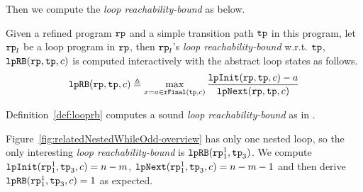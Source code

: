 %
Then we compute the
\emph{loop reachability-bound} as below.
\begin{defn}
 \label{def:looprb}
 Given a refined program $\mathtt{rp}$ and a simple transition path $\mathtt{tp}$ in this program, 
 let $\mathtt{rp}_l$ be a loop program in $\mathtt{rp}$,
 then $\mathtt{rp}_l$'s \emph{loop reachability-bound} w.r.t. $\mathtt{tp}$, $\mathtt{lpRB}(\mathtt{rp}, \mathtt{tp}, c)$
 is computed interactively with the abstract loop states as follows. 
 \[
 \mathtt{lpRB}(\mathtt{rp}, \mathtt{tp}, c) \triangleq
 \max\limits_{x = a \in \mathtt{rFinal}(\mathtt{tp}, c)}
 \frac{\mathtt{lpInit}(\mathtt{rp}, \mathtt{tp}, c) - a }{\mathtt{lpNext}(\mathtt{rp}, \mathtt{tp}, c)}
 \]
\end{defn}
%
Definition~\ref{def:looprb} computes a sound \emph{loop reachability-bound} as in .
%


Figure~\ref{fig:relatedNestedWhileOdd-overview} has only one nested loop, so
the only interesting \emph{loop reachability-bound} is $\mathtt{lpRB}(\mathtt{rp}_1^1, \mathtt{tp}_3)$.
We compute $\mathtt{lpInit}(\mathtt{rp}_1^1, \mathtt{tp}_3, c) = n - m $, $\mathtt{lpNext}(\mathtt{rp}_1^1, \mathtt{tp}_3, c) = n - m - 1$ and then derive $\mathtt{lpRB}(\mathtt{rp}_1^1, \mathtt{tp}_3, c) = 1$ as expected.

